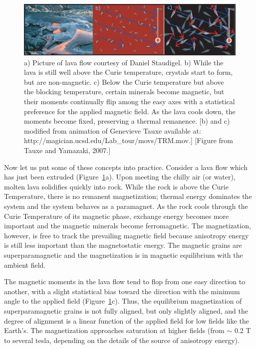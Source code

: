 \begin{figure}[h!tb]
\centering  \includegraphics[width=14 cm]{EPSfiles/lava.eps}
\caption{a) 
Picture of lava flow courtesy of Daniel Staudigel.  b) While the lava is still well above the Curie temperature, crystals start to form, but are non-magnetic.  c) Below the Curie temperature but above the blocking temperature,  certain minerals become magnetic, but their moments continually flip among the easy axes with a statistical preference for the applied magnetic field.  As the lava cools down, the moments become fixed, preserving a thermal remanence.  [b) and c) modified from animation of Genevieve Tauxe available at: {http://magician.ucsd.edu/Lab\_tour/movs/TRM.mov}.] [Figure from Tauxe and Yamazaki, 2007.]}
\label{fig:lava}
\end{figure}


Now let us put some of these concepts into practice.  
Consider a lava flow which has just been extruded (Figure~\ref{fig:lava}a).
Upon meeting the chilly air (or water),  molten lava  solidifies quickly into rock.  While the rock is above the 
Curie
Temperature,  there is no  remanent magnetization; 
thermal energy dominates the
system and the system behaves as a paramagnet.  As the rock cools through the Curie Temperature of its magnetic phase,
exchange energy becomes more important and the magnetic minerals  become ferromagnetic.    The magnetization, however, is free to track the
prevailing magnetic field  because 
anisotropy energy is still  less important
than the magnetostatic energy.  The magnetic grains are  
superparamagnetic and the magnetization is in 
magnetic equilibrium with the ambient field.


The magnetic moments in the lava flow  tend to flop from one  easy
direction to another,
with a slight statistical bias toward the direction with 
the minimum angle to the applied field (Figure~\ref{fig:lava}c).  Thus, the 
equilibrium magnetization of superparamagnetic grains is not fully
aligned,   but only slightly aligned, and the degree of alignment is a linear function of the applied field for low fields like the Earth's.  The magnetization approaches saturation at higher
fields (from $\sim$ 0.2 T to several tesla, depending on the details of
the source of anisotropy energy).  



